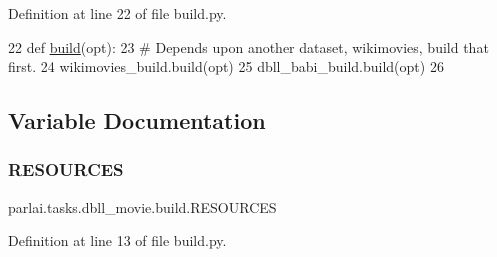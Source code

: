 Definition at line 22 of file build.\+py.


\begin{DoxyCode}
22 \textcolor{keyword}{def }\hyperlink{namespacedialog__babi__feedback_1_1build_a7a9d289f7493a5ded13c4b7f071b6184}{build}(opt):
23     \textcolor{comment}{# Depends upon another dataset, wikimovies, build that first.}
24     wikimovies\_build.build(opt)
25     dbll\_babi\_build.build(opt)
26 \end{DoxyCode}


\subsection{Variable Documentation}
\mbox{\label{namespaceparlai_1_1tasks_1_1dbll__movie_1_1build_a16c744c36b8666d1a259b20627e33872}} 
\subsubsection{\texorpdfstring{R\+E\+S\+O\+U\+R\+C\+ES}{RESOURCES}}
{\footnotesize\ttfamily parlai.\+tasks.\+dbll\+\_\+movie.\+build.\+R\+E\+S\+O\+U\+R\+C\+ES}



Definition at line 13 of file build.\+py.

